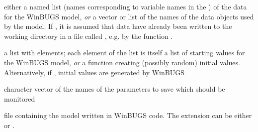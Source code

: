 \begin{Arguments}
\begin{ldescription}
\item[\code{data}] either a named list (names corresponding to variable names in the )
of the data for the WinBUGS model, \emph{or}
a vector or list of the names of the data objects used by the model.
If , it is assumed that data have already been written to the working directory
in a file called , e.g. by the function .
\item[\code{inits}] a list with  elements; each element of the list is
itself a list of starting values for the WinBUGS model, \emph{or}
a function creating (possibly random) initial values.
Alternatively, if , initial values are generated by WinBUGS
\item[\code{parameters.to.save}] character vector of the names of the parameters to save which should be monitored
\item[\code{model.file}] file containing the model written in WinBUGS code.
The extension can be either  or .


\end{ldescription}
\end{Arguments}
